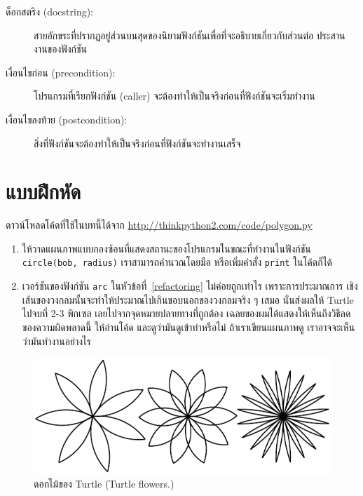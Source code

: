 \begin{description}
\item[ด็อกสตริง (docstring):] สายอักขระที่ปรากฏอยู่ส่วนบนสุดของนิยามฟังก์ชันเพื่อที่จะอธิบายเกี่ยวกับส่วนต่อ
ประสานงานของฟังก์ชัน

\item[เงื่อนไขก่อน (precondition):] โปรแกรมที่เรียกฟังก์ชัน (caller) จะต้องทำให้เป็นจริงก่อนที่ฟังก์ชันจะเริ่มทำงาน

\item[เงื่อนไขลงท้าย (postcondition):] สิ่งที่ฟังก์ชันจะต้องทำให้เป็นจริงก่อนที่ฟังก์ชันจะทำงานเสร็จ

\end{description}


\section{แบบฝึกหัด}

\begin{exercise}

ดาวน์โหลดโค้ดที่ใช้ในบทนี้ได้จาก
\url{http://thinkpython2.com/code/polygon.py}

\begin{enumerate}

\item ให้วาดแผนภาพแบบกองซ้อนที่แสดงสถานะของโปรแกรมในขณะที่ทำงานในฟังก์ชัน {\tt circle(bob, radius)}
เราสามารถคำนวณโดยมือ หรือเพิ่มคำสั่ง {\tt print} ในโค้ดก็ได้

\item เวอร์ชันของฟังก์ชัน {\tt arc} ในหัวข้อที่~\ref{refactoring} ไม่ค่อยถูกเท่าไร เพราะการประมาณการ
เชิงเส้นของวงกลมนั้นจะทำให้ประมาณไปเกินขอบนอกของวงกลมจริง ๆ เสมอ นั่นส่งผลให้ Turtle ไปจบที่ 2-3 พิกเซล
เลยไปจากจุดหมายปลายทางที่ถูกต้อง  เฉลยของผมได้แสดงให้เห็นถึงวิธีลดของความผิดพลาดนี้ ให้อ่านโค้ด
และดูว่ามันดูเข้าท่าหรือไม่ ถ้าเราเขียนแผนภาพดู เราอาจจะเห็นว่ามันทำงานอย่างไร

\end{enumerate}

\end{exercise}

\begin{figure}
\centerline
{\includegraphics[scale=0.8]{figs/flowers.pdf}}
\caption{ดอกไม้ของ Turtle (Turtle flowers.)}
\label{fig.flowers}
\end{figure}

